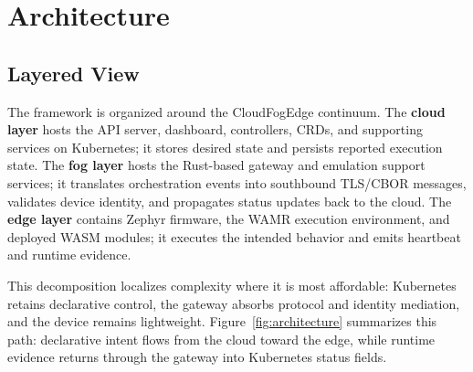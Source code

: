 \section{Architecture}\label{sec:architecture}

\subsection{Layered View}
The framework is organized around the Cloud\textendash{}Fog\textendash{}Edge continuum. The \textbf{cloud layer} hosts the API server, dashboard, controllers, CRDs, and supporting services on Kubernetes; it stores desired state and persists reported execution state. The \textbf{fog layer} hosts the Rust-based gateway and emulation support services; it translates orchestration events into southbound TLS/CBOR messages, validates device identity, and propagates status updates back to the cloud. The \textbf{edge layer} contains Zephyr firmware, the WAMR execution environment, and deployed WASM modules; it executes the intended behavior and emits heartbeat and runtime evidence.

This decomposition localizes complexity where it is most affordable: Kubernetes retains declarative control, the gateway absorbs protocol and identity mediation, and the device remains lightweight. Figure~\ref{fig:architecture} summarizes this path: declarative intent flows from the cloud toward the edge, while runtime evidence returns through the gateway into Kubernetes status fields.

